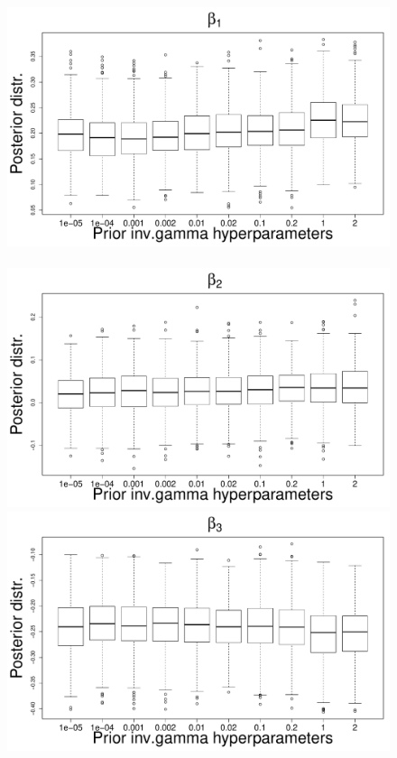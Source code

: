 \documentclass{statsoc}
\begin{document}
\begin{figure}
\centering
\includegraphics[scale=0.25]{Sensitivity/beta_1_sensitivity.pdf}~
\includegraphics[scale=0.25]{Sensitivity/beta_2_sensitivity.pdf}\\
\includegraphics[scale=0.25]{Sensitivity/beta_3_sensitivity.pdf}~

\end{figure}
\end{document}
